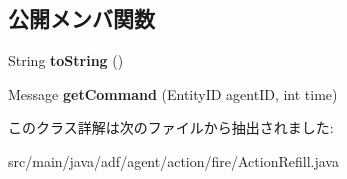 \subsection*{公開メンバ関数}
\begin{DoxyCompactItemize}
\item 
\hypertarget{classadf_1_1agent_1_1action_1_1fire_1_1ActionRefill_aefdc3e931e79ebc71cd29bdcad939109}{}\label{classadf_1_1agent_1_1action_1_1fire_1_1ActionRefill_aefdc3e931e79ebc71cd29bdcad939109} 
String {\bfseries to\+String} ()
\item 
\hypertarget{classadf_1_1agent_1_1action_1_1fire_1_1ActionRefill_a2bed6b1eb1ece6d45e6b1526b69b337a}{}\label{classadf_1_1agent_1_1action_1_1fire_1_1ActionRefill_a2bed6b1eb1ece6d45e6b1526b69b337a} 
Message {\bfseries get\+Command} (Entity\+ID agent\+ID, int time)
\end{DoxyCompactItemize}


このクラス詳解は次のファイルから抽出されました\+:\begin{DoxyCompactItemize}
\item 
src/main/java/adf/agent/action/fire/Action\+Refill.\+java\end{DoxyCompactItemize}
